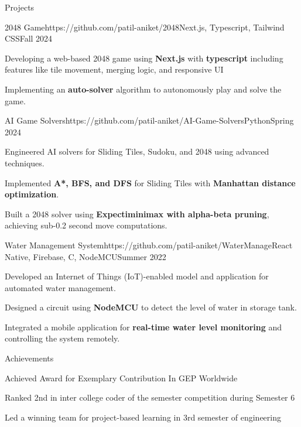 \documentclass{resume} %
\begin{document}
	\begin{rSection}{Projects}
		\begin{rProject}{2048 Game}{https://github.com/patil-aniket/2048}{Next.js, Typescript, Tailwind CSS}{Fall 2024}
			\item Developing a web-based 2048 game using  {\bf Next.js} with {\bf typescript} including features like tile movement, merging logic, and responsive UI
			\item Implementing an  {\bf auto-solver} algorithm to autonomously play and solve the game.
		\end{rProject}
		\begin{rProject}{AI Game Solvers}{https://github.com/patil-aniket/AI-Game-Solvers}{Python}{Spring 2024}
			\item Engineered AI solvers for Sliding Tiles, Sudoku, and 2048 using advanced techniques. 
			\item Implemented  {\bf A*, BFS, and DFS} for Sliding Tiles with  {\bf Manhattan distance optimization}.
			\item Built a 2048 solver using  {\bf Expectiminimax with alpha-beta pruning}, achieving sub-0.2 second move computations.
		\end{rProject}
		\begin{rProject}{Water Management System}{https://github.com/patil-aniket/WaterManage}{React Native, Firebase, C, NodeMCU}{Summer 2022}
			\item Developed an Internet of Things (IoT)-enabled model and application for automated water management.
			\item Designed a circuit using  {\bf NodeMCU} to detect the level of water in storage tank.
			\item Integrated a mobile application for  {\bf real-time water level monitoring} and controlling the system remotely.
		\end{rProject}
	\end{rSection}

	\begin{rSection}{Achievements}
		\begin{rSubsection}{}{}{}
			\item Achieved Award for Exemplary Contribution In GEP Worldwide
			\item Ranked 2nd in inter college coder of the semester competition during Semester 6
			\item Led a winning team for project-based learning in 3rd semester of engineering
		\end{rSubsection}
	\end{rSection}
\end{document}
